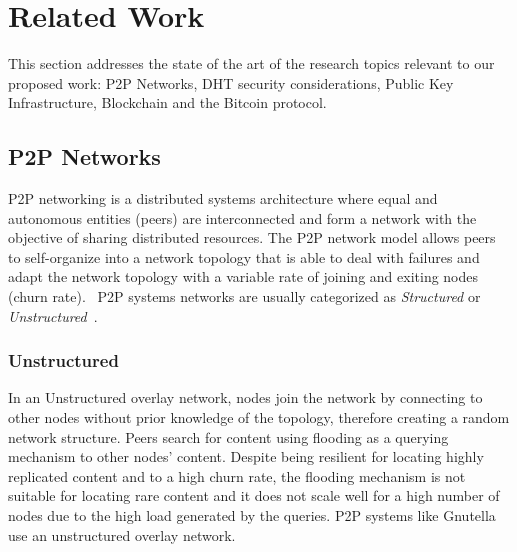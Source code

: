 \chapter{Related Work}
\label{chapter:relatedwork}
This section addresses the state of the art of the research topics relevant to our proposed work: P2P Networks, DHT security considerations, Public Key Infrastructure, Blockchain and the Bitcoin protocol.

\section{P2P Networks}

\ac{P2P} networking is a distributed systems architecture where equal and autonomous entities (peers) are interconnected and form a network with the objective of sharing distributed resources.
The \ac{P2P} network model allows peers to self-organize into a network topology that is able to deal with failures and adapt the network topology with a variable rate of joining and exiting nodes (churn rate).~\cite{GuptaA11}
\ac{P2P} systems networks are usually categorized as \textit{Structured} or \textit{Unstructured}~\cite{Lua2005}.

\subsection{Unstructured} In an Unstructured overlay network, nodes join the network by connecting to other nodes without prior knowledge of the topology, therefore creating a random network structure.
Peers search for content using flooding as a querying mechanism to other nodes' content.
Despite being resilient for locating highly replicated content and to a high churn rate, the flooding mechanism is not suitable for locating rare content and it does not scale well for a high number of nodes due to the high load generated by the queries.
\ac{P2P} systems like Gnutella~\cite{gnutella} use an unstructured overlay network.


